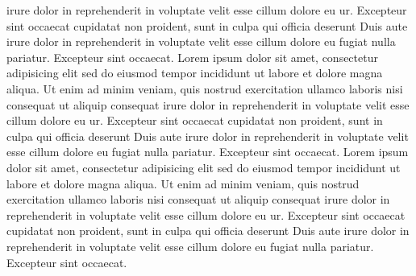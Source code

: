 \documentclass[a4paper, oneside, notitlepage, 12pt]{article}
\begin{document}
\begin{pages}
\begin{Rightside}
 irure dolor in reprehenderit
in voluptate velit esse cillum dolore eu ur. Excepteur sint occaecat
cupidatat non proident, sunt in culpa qui officia deserunt
Duis aute irure dolor in reprehenderit
in voluptate velit esse cillum dolore eu fugiat nulla
pariatur. Excepteur sint occaecat.
\pend
{}
Lorem ipsum dolor sit amet, consectetur adipisicing elit
sed do eiusmod tempor incididunt ut labore et dolore
magna aliqua. Ut enim ad minim veniam, quis nostrud
exercitation ullamco laboris nisi
 consequat ut aliquip consequat\pend[\vskip 2ex]
 irure dolor in reprehenderit
in voluptate velit esse cillum dolore eu ur. Excepteur sint occaecat
cupidatat non proident, sunt in culpa qui officia deserunt
Duis aute irure dolor in reprehenderit
in voluptate velit esse cillum dolore eu fugiat nulla
pariatur. Excepteur sint occaecat.
\pend
{}
Lorem ipsum dolor sit amet, consectetur adipisicing elit
sed do eiusmod tempor incididunt ut labore et dolore
magna aliqua. Ut enim ad minim veniam, quis nostrud
exercitation ullamco laboris nisi
 consequat ut aliquip consequat\pend[\vskip 2ex]
 irure dolor in reprehenderit
in voluptate velit esse cillum dolore eu ur. Excepteur sint occaecat
cupidatat non proident, sunt in culpa qui officia deserunt
Duis aute irure dolor in reprehenderit
in voluptate velit esse cillum dolore eu fugiat nulla
pariatur. Excepteur sint occaecat.
\pend
{}

\end{Rightside}
\end{pages}
\end{document}
